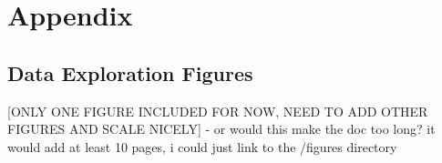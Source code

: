 \documentclass[12pt]{article}
\begin{document}
\begin{singlespace}

\nocite{*} %

\end{singlespace}

\newpage
\section{Appendix}

\subsection{Data Exploration Figures} \label{appendix_figs}
\textcolor{BrickRed}{[ONLY ONE FIGURE INCLUDED FOR NOW, NEED TO ADD OTHER FIGURES AND SCALE NICELY] - or would this make the doc too long? it would add at least 10 pages, i could just link to the /figures directory}
\end{document}
